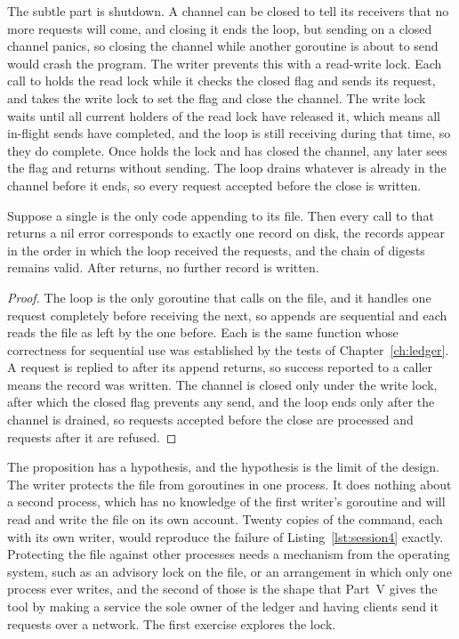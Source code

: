 The subtle part is shutdown. A channel can be closed to tell its receivers that no more requests will come, and closing it ends the loop, but sending on a closed channel panics, so closing the channel while another goroutine is about to send would crash the program. The writer prevents this with a read-write lock. Each call to  holds the read lock while it checks the closed flag and sends its request, and  takes the write lock to set the flag and close the channel. The write lock waits until all current holders of the read lock have released it, which means all in-flight sends have completed, and the loop is still receiving during that time, so they do complete. Once  holds the lock and has closed the channel, any later  sees the flag and returns  without sending. The loop drains whatever is already in the channel before it ends, so every request accepted before the close is written.

\begin{proposition}\label{prop:writer}
Suppose a single  is the only code appending to its file. Then every call to  that returns a nil error corresponds to exactly one record on disk, the records appear in the order in which the loop received the requests, and the chain of digests remains valid. After  returns, no further record is written.
\end{proposition}

\begin{proof}
The loop is the only goroutine that calls  on the file, and it handles one request completely before receiving the next, so appends are sequential and each reads the file as left by the one before. Each is the same function whose correctness for sequential use was established by the tests of Chapter~\ref{ch:ledger}. A request is replied to after its append returns, so success reported to a caller means the record was written. The channel is closed only under the write lock, after which the closed flag prevents any send, and the loop ends only after the channel is drained, so requests accepted before the close are processed and requests after it are refused.
\end{proof}

The proposition has a hypothesis, and the hypothesis is the limit of the design. The writer protects the file from goroutines in one process. It does nothing about a second process, which has no knowledge of the first writer's goroutine and will read and write the file on its own account. Twenty copies of the command, each with its own writer, would reproduce the failure of Listing~\ref{lst:session4} exactly. Protecting the file against other processes needs a mechanism from the operating system, such as an advisory lock on the file, or an arrangement in which only one process ever writes, and the second of those is the shape that Part~V gives the tool by making a service the sole owner of the ledger and having clients send it requests over a network. The first exercise explores the lock.

